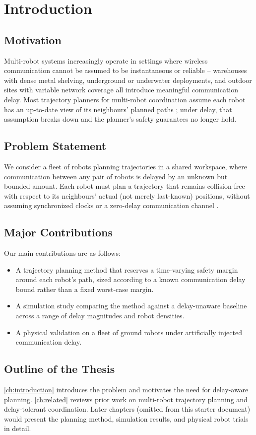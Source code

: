 \chapter{Introduction}
\label{ch:introduction}

\section{Motivation}
Multi-robot systems increasingly operate in settings where wireless
communication cannot be assumed to be instantaneous or reliable --
warehouses with dense metal shelving, underground or underwater
deployments, and outdoor sites with variable network coverage all
introduce meaningful communication delay. Most trajectory planners for
multi-robot coordination assume each robot has an up-to-date view of its
neighbours' planned paths \citep{VanDenBerg2011}; under delay, that
assumption breaks down and the planner's safety guarantees no longer hold.

\section{Problem Statement}
We consider a fleet of robots planning trajectories in a shared workspace,
where communication between any pair of robots is delayed by an unknown
but bounded amount. Each robot must plan a trajectory that remains
collision-free with respect to its neighbours' actual (not merely
last-known) positions, without assuming synchronized clocks or a
zero-delay communication channel \citep{Zhou2017}.

\section{Major Contributions}
Our main contributions are as follows:
\begin{itemize}
  \item A trajectory planning method that reserves a time-varying safety
    margin around each robot's path, sized according to a known
    communication delay bound rather than a fixed worst-case margin.
  \item A simulation study comparing the method against a delay-unaware
    baseline across a range of delay magnitudes and robot densities.
  \item A physical validation on a fleet of ground robots under
    artificially injected communication delay.
\end{itemize}

\section{Outline of the Thesis}
\cref{ch:introduction} introduces the problem and motivates the need for
delay-aware planning. \cref{ch:related} reviews prior work on multi-robot
trajectory planning and delay-tolerant coordination. Later chapters
(omitted from this starter document) would present the planning method,
simulation results, and physical robot trials in detail.
